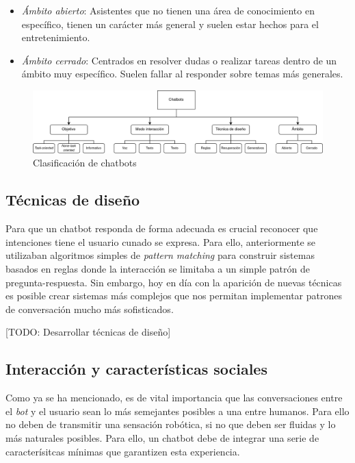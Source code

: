 \begin{itemize}
	\item \textit{Ámbito  abierto}: Asistentes que no tienen una área de conocimiento en específico, tienen un carácter más general y suelen estar hechos para el entretenimiento.
	\item \textit{Ámbito cerrado}: Centrados en resolver dudas o realizar tareas dentro de un ámbito muy específico. Suelen  fallar al responder sobre temas más generales.
\end{itemize}


\begin{figure}[htbp]
\centering
\includegraphics[scale=0.25]{../images/clasificacionChatbots.png} 
\caption{Clasificación de chatbots}
\label{fig:x clasificacion chatbots}
\end{figure}

 
 
\subsection{Técnicas de diseño }
\label{tecnicas diseño}
Para que un chatbot responda de forma adecuada es crucial reconocer que intenciones tiene el usuario cunado se expresa. Para ello, anteriormente se utilizaban algoritmos simples de \textit{pattern matching} para construir sistemas basados en reglas donde la interacción se limitaba a un simple patrón de pregunta-respuesta. Sin embargo, hoy en día con la aparición de nuevas técnicas es posible crear sistemas más complejos que nos permitan implementar patrones de conversación mucho más sofisticados.%


[TODO: Desarrollar técnicas de diseño]


\subsection{Interacción y características sociales}
Como ya se ha mencionado, es de vital importancia que las conversaciones entre el \textit{bot} y el usuario sean lo más semejantes posibles a una entre humanos. Para ello no deben de transmitir una sensación robótica, si no que deben ser fluidas y lo más naturales posibles. Para ello, un chatbot debe de integrar una serie de caracterísitcas mínimas que garantizen esta experiencia.\\

